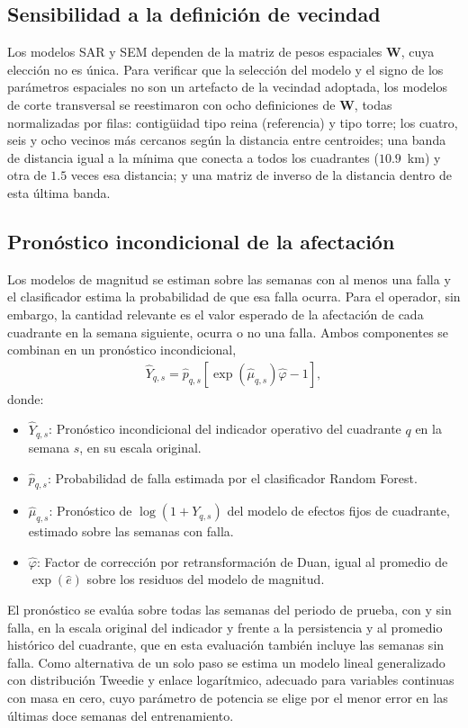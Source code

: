 \subsection{Sensibilidad a la definición de vecindad}
\label{sec:sensibilidad_w_met}
Los modelos SAR y SEM dependen de la matriz de pesos espaciales $\mathbf{W}$, cuya elección no es única. Para verificar que la selección del modelo y el signo de los parámetros espaciales no son un artefacto de la vecindad adoptada, los modelos de corte transversal se reestimaron con ocho definiciones de $\mathbf{W}$, todas normalizadas por filas: contigüidad tipo reina (referencia) y tipo torre; los cuatro, seis y ocho vecinos más cercanos según la distancia entre centroides; una banda de distancia igual a la mínima que conecta a todos los cuadrantes ($10{.}9$~km) y otra de $1{.}5$ veces esa distancia; y una matriz de inverso de la distancia dentro de esta última banda.

\subsection{Pronóstico incondicional de la afectación}
\label{sec:pronostico_incondicional}
Los modelos de magnitud se estiman sobre las semanas con al menos una falla y el clasificador estima la probabilidad de que esa falla ocurra. Para el operador, sin embargo, la cantidad relevante es el valor esperado de la afectación de cada cuadrante en la semana siguiente, ocurra o no una falla. Ambos componentes se combinan en un pronóstico incondicional,
\begin{equation}
    \begin{aligned}
    \hat{Y}_{q,s} = \hat{p}_{q,s} \left[ \exp\left( \hat{\mu}_{q,s} \right) \hat{\varphi} - 1 \right],
    \end{aligned}
    \label{eq:pronostico_incondicional}
\end{equation}
donde:
\begin{itemize}
    \item $\hat{Y}_{q,s}$: Pronóstico incondicional del indicador operativo del cuadrante $q$ en la semana $s$, en su escala original.
    \item $\hat{p}_{q,s}$: Probabilidad de falla estimada por el clasificador Random Forest.
    \item $\hat{\mu}_{q,s}$: Pronóstico de $\log(1+Y_{q,s})$ del modelo de efectos fijos de cuadrante, estimado sobre las semanas con falla.
    \item $\hat{\varphi}$: Factor de corrección por retransformación de Duan, igual al promedio de $\exp(\hat{e})$ sobre los residuos del modelo de magnitud.
\end{itemize}
El pronóstico se evalúa sobre todas las semanas del periodo de prueba, con y sin falla, en la escala original del indicador y frente a la persistencia y al promedio histórico del cuadrante, que en esta evaluación también incluye las semanas sin falla. Como alternativa de un solo paso se estima un modelo lineal generalizado con distribución Tweedie y enlace logarítmico, adecuado para variables continuas con masa en cero, cuyo parámetro de potencia se elige por el menor error en las últimas doce semanas del entrenamiento.

